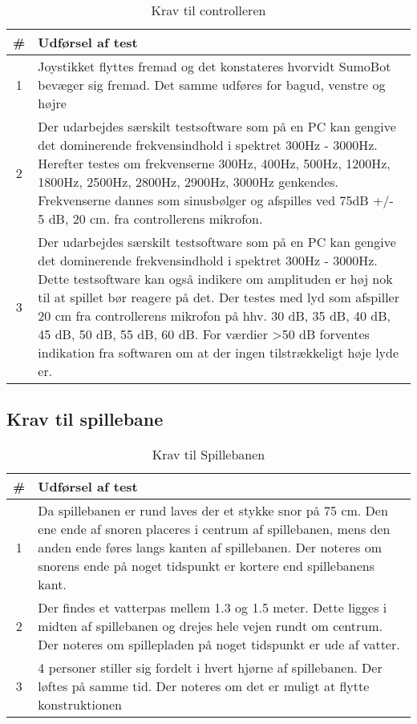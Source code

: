 \begin{table}[]
\centering
\caption{Krav til controlleren}\label{tab:Controller Krav}
\begin{tabular}{c p{7cm}}
\# & Udførsel af test \\ \midrule
1 & Joystikket flyttes fremad og det konstateres hvorvidt SumoBot bevæger sig fremad. Det samme udføres for bagud, venstre og højre  \\\midrule
2 & Der udarbejdes særskilt testsoftware som på en PC kan gengive det dominerende frekvensindhold i spektret 300Hz - 3000Hz. Herefter testes om frekvenserne 300Hz, 400Hz, 500Hz, 1200Hz, 1800Hz, 2500Hz, 2800Hz, 2900Hz, 3000Hz genkendes. Frekvenserne dannes som sinusbølger og afspilles ved 75dB +/- 5 dB, 20 cm. fra controllerens mikrofon. \\\midrule
3 & Der udarbejdes særskilt testsoftware som på en PC kan gengive det dominerende frekvensindhold i spektret 300Hz - 3000Hz. Dette testsoftware kan også indikere om amplituden er høj nok til at spillet bør reagere på det. Der testes med lyd som afspiller 20 cm fra controllerens mikrofon på hhv. 30 dB, 35 dB, 40 dB, 45 dB, 50 dB, 55 dB, 60 dB. For værdier >50 dB forventes indikation fra softwaren om at der ingen tilstrækkeligt høje lyde er.\\\bottomrule
\end{tabular}
\end{table}

\subsection{Krav til spillebane}

\begin{table}[]
\centering
\caption{Krav til Spillebanen}\label{tab:ASE Krav}
\begin{tabular}{c p{7cm}}
\# & Udførsel af test \\ \midrule
1 & Da spillebanen er rund laves der et stykke snor på 75 cm. Den ene ende af snoren placeres i centrum af spillebanen, mens den anden ende føres langs kanten af spillebanen. Der noteres om snorens ende på noget tidspunkt er kortere end spillebanens kant. \\\midrule
2 & Der findes et vatterpas mellem 1.3 og 1.5 meter. Dette ligges i midten af spillebanen og drejes hele vejen rundt om centrum. Der noteres om spillepladen på noget tidspunkt er ude af vatter.  \\\midrule

3 &  \color{red} 4 personer stiller sig fordelt i hvert hjørne af spillebanen. Der løftes på samme tid. Der noteres om det er muligt at flytte konstruktionen \\\midrule

\end{tabular}
\end{table}

